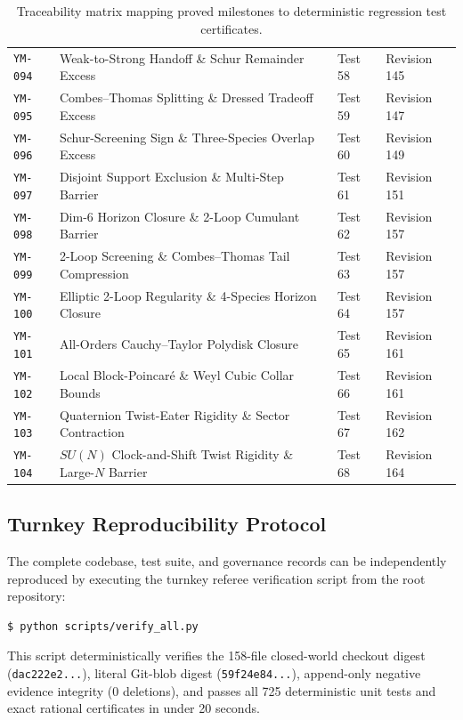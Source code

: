 \documentclass[11pt,a4paper]{article}
\theoremstyle{definition}
\theoremstyle{remark}
\begin{document}
\begin{table}[htbp]
{\begin{tabular}{@{}llll@{}}
\texttt{YM-094}  & Weak-to-Strong Handoff \& Schur Remainder Excess & Test 58 & Revision 145 \\
\texttt{YM-095}  & Combes--Thomas Splitting \& Dressed Tradeoff Excess & Test 59 & Revision 147 \\
\texttt{YM-096}  & Schur-Screening Sign \& Three-Species Overlap Excess & Test 60 & Revision 149 \\
\texttt{YM-097}  & Disjoint Support Exclusion \& Multi-Step Barrier & Test 61 & Revision 151 \\
\texttt{YM-098}  & Dim-6 Horizon Closure \& 2-Loop Cumulant Barrier & Test 62 & Revision 157 \\
\texttt{YM-099}  & 2-Loop Screening \& Combes--Thomas Tail Compression & Test 63 & Revision 157 \\
\texttt{YM-100}  & Elliptic 2-Loop Regularity \& 4-Species Horizon Closure & Test 64 & Revision 157 \\
\texttt{YM-101}  & All-Orders Cauchy--Taylor Polydisk Closure & Test 65 & Revision 161 \\
\texttt{YM-102}  & Local Block-Poincar\'e \& Weyl Cubic Collar Bounds & Test 66 & Revision 161 \\
\texttt{YM-103}  & Quaternion Twist-Eater Rigidity \& Sector Contraction & Test 67 & Revision 162 \\
\texttt{YM-104}  & $SU(N)$ Clock-and-Shift Twist Rigidity \& Large-$N$ Barrier & Test 68 & Revision 164 \\
\bottomrule
\end{tabular}%
}
\caption{Traceability matrix mapping proved milestones to deterministic regression test certificates.}
\label{tab:traceability_matrix}
\end{table}

\subsection{Turnkey Reproducibility Protocol}
The complete codebase, test suite, and governance records can be independently reproduced by executing the turnkey referee verification script from the root repository:
\begin{verbatim}
$ python scripts/verify_all.py
\end{verbatim}
This script deterministically verifies the 158-file closed-world checkout digest (\texttt{dac222e2...}), literal Git-blob digest (\texttt{59f24e84...}), append-only negative evidence integrity (0 deletions), and passes all 725 deterministic unit tests and exact rational certificates in under 20 seconds.
\end{document}
